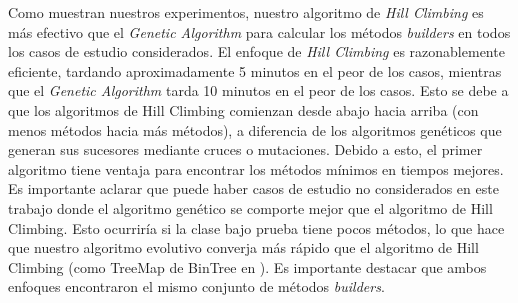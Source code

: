 Como muestran nuestros experimentos, nuestro algoritmo de \textit{Hill Climbing} es más efectivo que el \textit{Genetic Algorithm} para calcular los métodos \emph{builders} en todos los casos de estudio considerados. El enfoque de \textit{Hill Climbing} es razonablemente eficiente, tardando aproximadamente 5 minutos en el peor de los casos, mientras que el \textit{Genetic Algorithm} tarda 10 minutos en el peor de los casos. Esto se debe a que los algoritmos de Hill Climbing comienzan desde abajo hacia arriba (con menos métodos hacia más métodos), a diferencia de los algoritmos genéticos que generan sus sucesores mediante cruces o mutaciones. Debido a esto, el primer algoritmo tiene ventaja para encontrar los métodos mínimos en tiempos mejores. Es importante aclarar que puede haber casos de estudio no considerados en este trabajo donde el algoritmo genético se comporte mejor que el algoritmo de Hill Climbing. Esto ocurriría si la clase bajo prueba tiene pocos métodos, lo que hace que nuestro algoritmo evolutivo converja más rápido que el algoritmo de Hill Climbing (como TreeMap de BinTree en \cite{Visser:2006}). Es importante destacar que ambos enfoques encontraron el mismo conjunto de métodos \emph{builders}.


